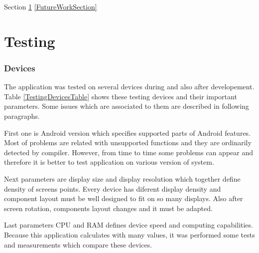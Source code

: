 
Section \ref{TestingSection} \ref{FutureWorkSection}

\section{Testing}\label{TestingSection}

\subsubsection{Devices}
The application was tested on several devices during and also after developement. Table \ref{TestingDevicesTable} shows
these testing devices and their important parameters. Some issues which are associated to them are described in
following paragraphs.

First one is Android version which specifies supported parts of Android features. Most of problems are related with
unsupported functions and they are ordinarily detected by compiler. However, from time to time some problems can appear
and therefore it is better to test application on various version of system.

Next parameters are display size and display resolution which together define density of screens points. Every device
has diferent display density and component layout must be well designed to fit on so many displays. Also after screen
rotation, components layout changes and it must be adapted.

Last parameters CPU and RAM defines device speed and computing capabilities. Because this application calculates with
many values, it was performed some tests and measurements which compare these devices.

